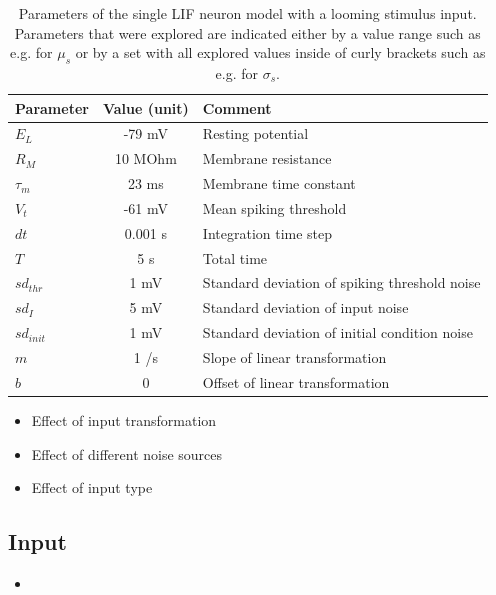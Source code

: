 \documentclass[a4paper,10pt,hidelinks]{scrartcl}
\begin{document}
	\begin{table} [!th]
		\begin{center}
			\begin{tabular}{|l|c|p{7cm}|}
				\hline
				\textbf{Parameter} & \textbf{Value (unit)} & \textbf{Comment} \\
				\hline
				$E_L$ & -79 mV & Resting potential\\
				$R_M$ & 10 MOhm & Membrane resistance\\
				$\tau_{m}$ & 23 ms & Membrane time constant\\
				$V_t$ & -61 mV & Mean spiking threshold\\
				$dt$ & 0.001 s & Integration time step\\
				$T$ & 5 s & Total time\\
				$sd_{thr}$ & 1 mV & Standard deviation of spiking threshold noise\\
				$sd_{I}$ & 5 mV & Standard deviation of input noise\\
				$sd_{init}$ & 1 mV & Standard deviation of initial condition noise\\
				$m$ & 1 \textdegree/s  & Slope of linear transformation\\
				$b$ & 0 \textdegree & Offset of linear transformation\\
				\hline
			\end{tabular}
		\end{center}
		\caption{Parameters of the single LIF neuron model with a looming stimulus input. Parameters that were explored are indicated either by a value range such as e.g. for $\mu_s$ or by a set with all explored values inside of curly brackets such as e.g. for $\sigma_s$.}
		\label{tab:params}
	\end{table}
	\begin{itemize}
		\item Effect of input transformation
		\item Effect of different noise sources
		\item Effect of input type
	\end{itemize}
	\subsection{Input}
	\begin{itemize}
		\item 
	\end{itemize}
\end{document}
